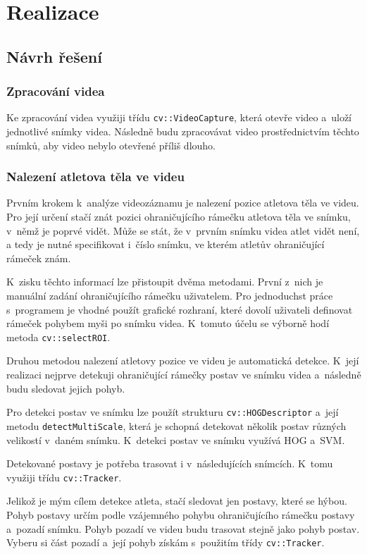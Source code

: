 \chapter{Realizace}

\section{Návrh řešení}

\subsection{Zpracování videa}

Ke zpracování videa využiji třídu \texttt{cv::VideoCapture}, která otevře video a~uloží jednotlivé snímky videa. Následně budu zpracovávat video prostřednictvím těchto snímků, aby video nebylo otevřené příliš dlouho.

\subsection{Nalezení atletova těla ve videu}

Prvním krokem k~analýze videozáznamu je nalezení pozice atletova těla ve videu. Pro její určení stačí znát pozici ohraničujícího rámečku atletova těla ve snímku, v~němž je poprvé vidět. Může se stát, že v~prvním snímku videa atlet vidět není, a tedy je nutné specifikovat i~číslo snímku, ve kterém atletův ohraničující rámeček znám.

K~zisku těchto informací lze přistoupit dvěma metodami. První z~nich je manuální zadání ohraničujícího rámečku uživatelem. Pro jednoduchst práce s~programem je vhodné použít grafické rozhraní, které dovolí uživateli definovat rámeček pohybem myši po snímku videa. K~tomuto účelu se výborně hodí metoda \texttt{cv::selectROI}.

Druhou metodou nalezení atletovy pozice ve videu je automatická detekce. K~její realizaci nejprve detekuji ohraničující rámečky postav ve snímku videa a~následně budu sledovat jejich pohyb.

Pro detekci postav ve snímku lze použít strukturu \texttt{cv::HOGDescriptor} a~její metodu \texttt{detectMultiScale}, která je schopná detekovat několik postav různých velikostí v~daném snímku. K~detekci postav ve snímku využívá HOG a~SVM.

Detekované postavy je potřeba trasovat i v~následujících snímcích. K~tomu využiji třídu \texttt{cv::Tracker}.

Jelikož je mým cílem detekce atleta, stačí sledovat jen postavy, které se hýbou. Pohyb postavy určím podle vzájemného pohybu ohraničujícího rámečku postavy a~pozadí snímku. Pohyb pozadí ve videu budu trasovat stejně jako pohyb postav. Vyberu si část pozadí a~její pohyb získám s~použitím třídy \texttt{cv::Tracker}.

